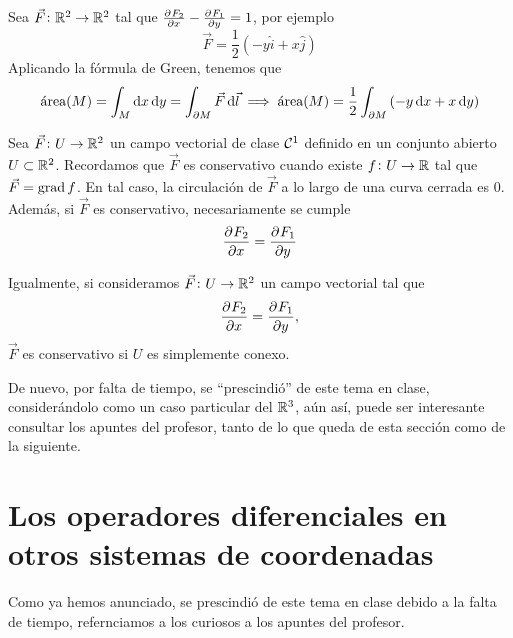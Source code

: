 \begin{example}
    Sea $\vec{F} \colon \mathbb{R}^2 \to \mathbb{R}^2$ tal que $\frac{\partial^{} F_2}{\partial x^{}} - \frac{\partial^{} F_1}{\partial y^{}} = 1$, por ejemplo
    \[
        \vec{F} = \frac{1}{2} \left( -y \hat{i} + x \hat{j} \right)
    \]
    Aplicando la fórmula de Green, tenemos que
    \[
        \text{área}(M) = \int_M \dif x \dif y = \int_{\partial M} \vec{F} \dif \vec{l} \implies
        \text{área}(M) = \frac{1}{2} \int_{\partial M} \left( -y \dif x + x \dif y \right)
    \]
\end{example}

\begin{prop}
    Sea $\vec{F} \colon U \to \mathbb{R}^2$ un campo vectorial de clase $\mathcal{C}^1$ definido en un conjunto abierto $U \subset \mathbb{R}^2$.
    Recordamos que $\vec{F}$ es conservativo cuando existe $f \colon U \to \mathbb{R}$ tal que $\vec{F} = \operatorname{grad} f$. En tal caso, la
    circulación de $\vec{F}$ a lo largo de una curva cerrada es 0. Además, si $\vec{F}$ es conservativo, necesariamente se cumple
    \[
        \frac{\partial^{} F_2}{\partial x^{}} = \frac{\partial^{} F_1}{\partial y^{}}
    \]
\end{prop}

\begin{prop}
    Igualmente, si consideramos $\vec{F} \colon U \to \mathbb{R}^2$ un campo vectorial tal que
    \[
        \frac{\partial^{} F_2}{\partial x^{}} = \frac{\partial^{} F_1}{\partial y^{}},
    \]
    $\vec{F}$ es conservativo si $U$ es simplemente conexo.
\end{prop}


De nuevo, por falta de tiempo, se ``prescindió'' de este tema en clase, considerándolo como un caso particular del $\mathbb{R}^3$, aún
así, puede ser interesante consultar los apuntes del profesor, tanto de lo que queda de esta sección como de la siguiente.

\section{Los operadores diferenciales en otros sistemas de coordenadas}

Como ya hemos anunciado, se prescindió de este tema en clase debido a la falta de tiempo, refernciamos a los curiosos a los apuntes del
profesor.
